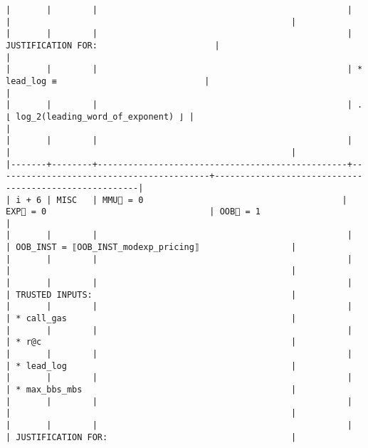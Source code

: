 \documentclass[varwidth=\maxdimen,margin=0.5cm,multi={verbatim}]{standalone}
\begin{document}
\begin{verbatim}
|       |        |                                                 |                                          |                                                       |
|       |        |                                                 | JUSTIFICATION FOR:                       |                                                       |
|       |        |                                                 | * lead_log ≡                             |                                                       |
|       |        |                                                 | .    ⌊ log_2(leading_word_of_exponent) ⌋ |                                                       |
|       |        |                                                 |                                          |                                                       |
|-------+--------+-------------------------------------------------+------------------------------------------+-------------------------------------------------------|
| i + 6 | MISC   | MMU🏴 = 0                                       | EXP🏴 = 0                                | OOB🏴 = 1                                             |
|       |        |                                                 |                                          | OOB_INST = ⟦OOB_INST_modexp_pricing⟧                  |
|       |        |                                                 |                                          |                                                       |
|       |        |                                                 |                                          | TRUSTED INPUTS:                                       |
|       |        |                                                 |                                          | * call_gas                                            |
|       |        |                                                 |                                          | * r@c                                                 |
|       |        |                                                 |                                          | * lead_log                                            |
|       |        |                                                 |                                          | * max_bbs_mbs                                         |
|       |        |                                                 |                                          |                                                       |
|       |        |                                                 |                                          | JUSTIFICATION FOR:                                    |

\end{verbatim}
\end{document}
